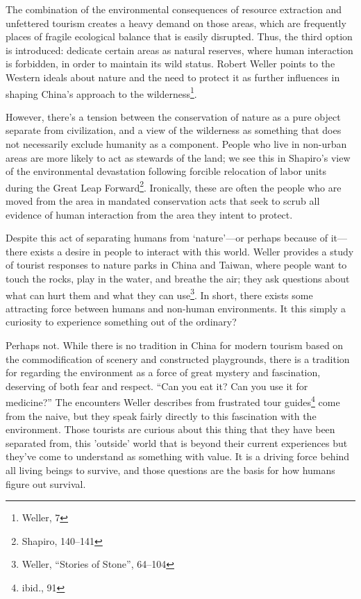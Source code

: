 The combination of the environmental consequences of resource extraction and
unfettered tourism creates a heavy demand on those areas, which are frequently
places of fragile ecological balance that is easily disrupted. Thus, the third
option is introduced: dedicate certain areas as natural reserves, where human
interaction is forbidden, in order to maintain its wild status. Robert Weller
points to the Western ideals about nature and the need to protect it as further
influences in shaping China's approach to the wilderness\footnote{Weller, 7}.

However, there's a tension between the conservation of nature as a pure object
separate from civilization, and a view of the wilderness as something that does
not necessarily exclude humanity as a component. People who live in non-urban
areas are more likely to act as stewards of the land; we see this in Shapiro's
view of the environmental devastation following forcible relocation of labor
units during the Great Leap Forward\footnote{Shapiro, 140--141}. Ironically,
these are often the people who are moved from the area in mandated conservation
acts that seek to scrub all evidence of human interaction from the area they
intent to protect.

Despite this act of separating humans from `nature'---or perhaps because of
it---there exists a desire in people to interact with this world. Weller
provides a study of tourist responses to nature parks in China and Taiwan, where
people want to touch the rocks, play in the water, and breathe the air; they ask
questions about what can hurt them and what they can use\footnote{Weller,
``Stories of Stone'', 64--104}. In short, there exists some attracting force
between humans and non-human environments. It this simply a curiosity to
experience something out of the ordinary?

Perhaps not. While there is no tradition in China for modern tourism based on
the commodification of scenery and constructed playgrounds, there is a tradition
for regarding the environment as a force of great mystery and fascination,
deserving of both fear and respect. ``Can you eat it? Can you use it for
medicine?'' The encounters Weller describes from frustrated tour
guides\footnote{ibid., 91} come from the naive, but they speak fairly directly
to this fascination with the environment. Those tourists are curious about this
thing that they have been separated from, this 'outside' world that is beyond
their current experiences but they've come to understand as something with
value. It is a driving force behind all living beings to survive, and those
questions are the basis for how humans figure out survival.


